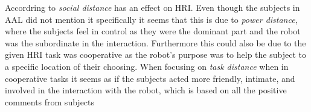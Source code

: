Accordring to \cite{PDF:HowSocialDistanceShapesHRI} \textit{social distance} has an effect on HRI. Even though the subjects in AAL did not mention it specifically it seems that this is due to \textit{power distance}, where the subjects feel in control as they were the dominant part and the robot was the subordinate in the interaction. Furthermore this could also be due to the given HRI task was cooperative as the robot's purpose was to help the subject to a specific location of their choosing. When focusing on \textit{task distance} when in cooperative tasks it seems as if the subjects acted more friendly, intimate, and involved in the interaction with the robot, which is based on all the positive comments from subjects 
 
  




